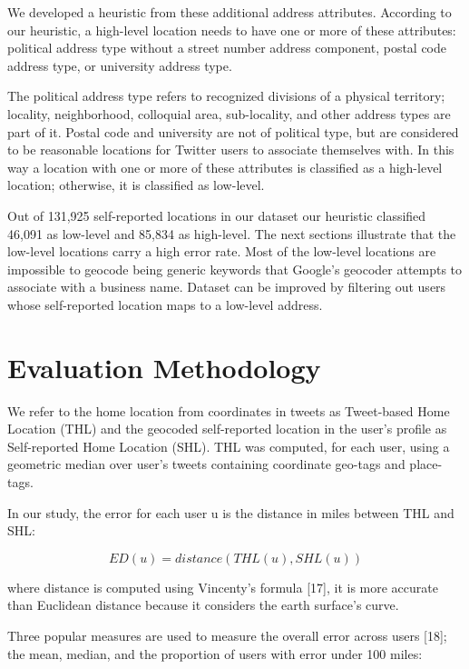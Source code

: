 We developed a heuristic from these additional address attributes. According to our heuristic, a high-level location needs to have one or more of these attributes: political address type without a street number address component, postal code address type, or university address type.

The political address type refers to recognized divisions of a physical territory; locality, neighborhood, colloquial area, sub-locality, and other address types are part of it. Postal code and university are not of political type, but are considered to be reasonable locations for Twitter users to associate themselves with. In this way a location with one or more of these attributes is classified as a high-level location; otherwise, it is classified as low-level.

Out of 131,925 self-reported locations in our dataset our heuristic classified 46,091 as low-level and 85,834 as high-level. The next sections illustrate that the low-level locations carry a high error rate. Most of the low-level locations are impossible to geocode being generic keywords that Google's geocoder attempts to associate with a business name. Dataset can be improved by filtering out users whose self-reported location maps to a low-level address.

\section{Evaluation Methodology}

We refer to the home location from coordinates in tweets as Tweet-based Home Location (THL) and the geocoded self-reported location in the user's profile as Self-reported Home Location (SHL). THL was computed, for each user, using a geometric median over user's tweets containing coordinate geo-tags and place-tags.

In our study, the error for each user u is the distance in miles between THL and SHL:

\begin{equation}
ED(u) = distance(THL(u), SHL(u))
\end{equation}

where distance is computed using Vincenty's formula [17], it is more accurate than Euclidean distance because it considers the earth surface's curve.

Three popular measures are used to measure the overall error across users [18]; the mean, median, and the proportion of users with error under 100 miles:

